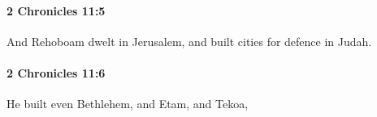 		\paragraph{2 Chronicles 11:5} %
			\label{2CHRONICLES-11-5}

			And Rehoboam dwelt in Jerusalem, and built cities for defence in Judah.


		\paragraph{2 Chronicles 11:6} %
			\label{2CHRONICLES-11-6}

			He built even Bethlehem, and Etam, and Tekoa,


